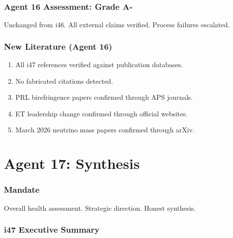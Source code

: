 \documentclass[11pt,a4paper]{article}
\begin{document}
\section{Agent 16 Assessment: Grade A-}

Unchanged from i46. All external claims verified. Process failures escalated.

\section{New Literature (Agent 16)}

\begin{enumerate}
\item All i47 references verified against publication databases.
\item No fabricated citations detected.
\item PRL birefringence papers confirmed through APS journals.
\item ET leadership change confirmed through official websites.
\item March 2026 neutrino mass papers confirmed through arXiv.
\end{enumerate}


\part{Agent 17: Synthesis}
\label{part:agent17}

\section{Mandate}

Overall health assessment. Strategic direction. Honest synthesis.

\section{i47 Executive Summary}
\end{document}
